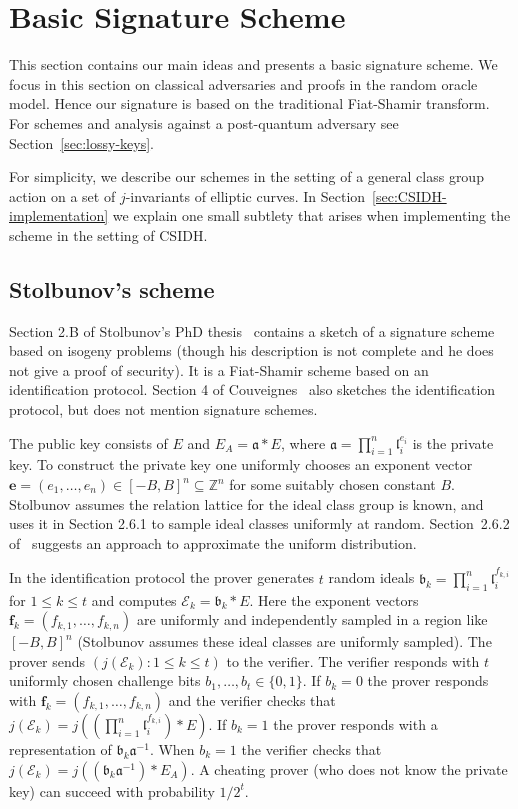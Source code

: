 \documentclass{llncs}
\newcommand{\E}{\mathcal{E}}
\newcommand{\Z}{\mathbb{Z}}
\renewcommand{\a}{\mathfrak{a}}
\renewcommand{\b}{\mathfrak{b}}
\renewcommand{\l}{\mathfrak{l}}
\newcommand{\e}{\mathbf{e}}
\newcommand{\f}{\mathbf{f}}
\begin{document}
\section{Basic Signature Scheme}\label{sec:basic-scheme}

This section contains our main ideas and presents a basic signature scheme.
We focus in this section on classical adversaries and proofs in the random oracle model.
Hence our signature is based on the traditional Fiat-Shamir transform.
For schemes and analysis against a post-quantum adversary see Section~\ref{sec:lossy-keys}.

For simplicity, we describe our schemes in the setting of a general class group action on a set of $j$-invariants of elliptic curves.
In Section~\ref{sec:CSIDH-implementation} we explain one small subtlety that arises when implementing the scheme in the setting of CSIDH.


\subsection{Stolbunov's scheme}\label{sec:Stolbunov}

Section 2.B of Stolbunov's PhD thesis~\cite{Sto12} contains a sketch of a signature scheme based on isogeny problems (though his description is not complete and he does not give a proof of security).
It is a Fiat-Shamir scheme based on an identification protocol.
Section 4 of Couveignes~\cite{Couv06} also sketches the identification protocol, but does not mention signature schemes.


The public key consists of $E$ and $E_A = \a * E$, where $\a = \prod_{i=1}^n \l_i^{e_i}$ is the private key.
To construct the private key one uniformly chooses an exponent vector $\e = (e_1, \dots, e_n) \in [-B,B]^n \subseteq \Z^n$ for some suitably chosen constant $B$.
Stolbunov assumes the relation lattice for the ideal class group is known, and uses it in Section 2.6.1 to sample ideal classes uniformly at random.
Section~2.6.2 of~\cite{Sto12} suggests an approach to approximate the uniform distribution.

In the identification protocol the prover generates $t$ random ideals $\b_k = \prod_{i=1}^n \l_i^{f_{k,i}}$ for $1 \le k \le t$ and computes $\E_k = \b_k * E$.
Here the exponent vectors $\f_k = ( f_{k,1}, \dots, f_{k,n} )$ are uniformly and independently sampled in a region like $[-B,B]^n$ (Stolbunov assumes these ideal classes are uniformly sampled).
The prover sends $(j( \E_k ) : 1 \le k \le t )$ to the verifier.
The verifier responds with $t$ uniformly chosen challenge bits $b_1, \dots, b_t \in \{0,1\}$.
If $b_k = 0$ the prover responds with $\f_k = ( f_{k,1}, \dots, f_{k,n} )$ and the verifier checks that $j(\E_k) = j( (\prod_{i=1}^n \l_i^{f_{k,i}}) * E )$.
If $b_k = 1$ the prover responds with a representation of $\b_k \a^{-1}$.
When $b_k=1$ the verifier checks that $j(\E_k) = j( (\b_k \a^{-1}) * E_A )$.
A cheating prover (who does not know the private key) can succeed with probability $1/2^t$.
\end{document}
